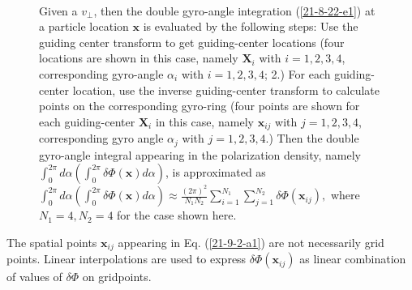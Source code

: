 \documentclass{llncs}
\begin{document}
\

\begin{figure}[h]
  \caption{\label{21-8-22-a1}Given a $v_{\perp}$, then the double gyro-angle
  integration (\ref{21-8-22-e1}) at a particle location $\mathbf{x}$ is
  evaluated by the following steps: Use the guiding center transform to get
  guiding-center locations (four locations are shown in this case, namely
  $\mathbf{X}_i$ with $i = 1, 2, 3, 4$, corresponding gyro-angle $\alpha_i$
  with $i = 1, 2, 3, 4$; 2.) For each guiding-center location, use the inverse
  guiding-center transform to calculate points on the corresponding gyro-ring
  (four points are shown for each guiding-center $\mathbf{X}_i$ in this case,
  namely $\mathbf{x}_{i j}$ with $j = 1, 2, 3, 4$, corresponding gyro angle
  $\alpha_j$ with $j = 1, 2, 3, 4$.) Then the double gyro-angle integral
  appearing in the polarization density, namely $\int_0^{2 \pi} d \alpha
  \left( \int_0^{2 \pi} \delta \Phi (\mathbf{x}) d \alpha \right)$, is
  approximated as
  $\label{21-9-2-a1} \int_0^{2 \pi} d \alpha \left( \int_0^{2 \pi} \delta \Phi
  (\mathbf{x}) d \alpha \right) \approx \frac{(2 \pi)^2}{N_1 N_2}  \sum_{i =
  1}^{N_1} \sum_{j = 1}^{N_2} \delta \Phi (\mathbf{x}_{i j}),$
  where $N_1 = 4, N_2 = 4$ for the case shown here.}
\end{figure}

The spatial points $\mathbf{x}_{i j}$ appearing in Eq. (\ref{21-9-2-a1}) are
not necessarily grid points. Linear interpolations are used to express $\delta
\Phi (\mathbf{x}_{i j})$ as linear combination of values of $\delta \Phi$ on
gridpoints.

\
\end{document}
